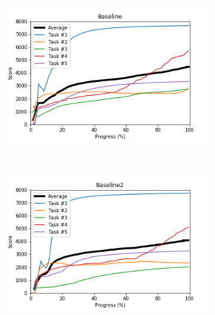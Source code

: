 \documentclass{article} %
\begin{document}
\begin{figure}[!ht]
	\begin{subfigure}[t]{0.5\textwidth}
        \centering
        \includegraphics[width=\textwidth]{images/Baseline.png}
    \end{subfigure}%
    ~ 
    \begin{subfigure}[t]{0.5\textwidth}
        \centering
        \includegraphics[width=\textwidth]{images/Baseline2.png}
    \end{subfigure}%


\end{figure}
\end{document}
